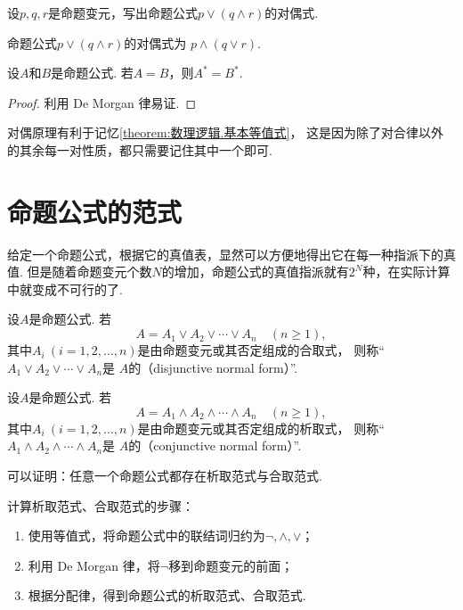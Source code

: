\begin{example}
设\(p,q,r\)是命题变元，写出命题公式\(p \lor (q \land r)\)的对偶式.
\begin{solution}
命题公式\(p \lor (q \land r)\)的对偶式为
\(p \land (q \lor r)\).
\end{solution}
\end{example}

\begin{theorem}[对偶原理]
设\(A\)和\(B\)是命题公式.
若\(A = B\)，则\(A^* = B^*\).
\begin{proof}
利用 De Morgan 律易证.
\end{proof}
\end{theorem}

对偶原理有利于记忆\cref{theorem:数理逻辑.基本等值式}，
这是因为除了对合律以外的其余每一对性质，都只需要记住其中一个即可.

\section{命题公式的范式}
给定一个命题公式，根据它的真值表，显然可以方便地得出它在每一种指派下的真值.
但是随着命题变元个数\(N\)的增加，命题公式的真值指派就有\(2^N\)种，在实际计算中就变成不可行的了.

\begin{definition}
设\(A\)是命题公式.
若\[
	A = A_1 \lor A_2 \lor \dotsb \lor A_n
	\quad(n\geq1),
\]
其中\(A_i\ (i=1,2,\dotsc,n)\)是由命题变元或其否定组成的合取式，
则称“\(A_1 \lor A_2 \lor \dotsb \lor A_n\)是
\(A\)的（disjunctive normal form）”.
\end{definition}

\begin{definition}
设\(A\)是命题公式.
若\[
	A = A_1 \land A_2 \land \dotsb \land A_n
	\quad(n\geq1),
\]
其中\(A_i\ (i=1,2,\dotsc,n)\)是由命题变元或其否定组成的析取式，
则称“\(A_1 \land A_2 \land \dotsb \land A_n\)是
\(A\)的（conjunctive normal form）”.
\end{definition}

可以证明：任意一个命题公式都存在析取范式与合取范式.

计算析取范式、合取范式的步骤：\begin{enumerate}
	\item 使用等值式，将命题公式中的联结词归约为\(\neg,\land,\lor\)；
	\item 利用 De Morgan 律，将\(\neg\)移到命题变元的前面；
	\item 根据分配律，得到命题公式的析取范式、合取范式.
\end{enumerate}

